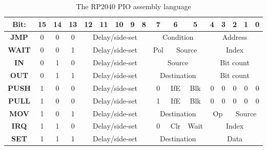 \begin{table}[h!]
    \begin{tabular}{|c|c|c|c|c|c|c|c|c|c|c|c|c|c|c|c|c|}
        \hline
        \textbf{Bit:} & 15 & 14 & 13 & 12                                  & 11                               & 10                             & 9                           & 8                          & 7 & 6 & 5 & 4 & 3 & 2 & 1 & 0 \\ \hline
        \textbf{JMP}  & 0  & 0  & 0  & \multicolumn{5}{c|}{Delay/side-set} & \multicolumn{3}{c|}{Condition}   & \multicolumn{5}{c|}{Address}                                                                                              \\ \hline
        \textbf{WAIT} & 0  & 0  & 1  & \multicolumn{5}{c|}{Delay/side-set} & Pol                              & \multicolumn{2}{c|}{Source}    & \multicolumn{5}{c|}{Index}                                                               \\ \hline
        \textbf{IN}   & 0  & 1  & 0  & \multicolumn{5}{c|}{Delay/side-set} & \multicolumn{3}{c|}{Source}      & \multicolumn{5}{c|}{Bit count}                                                                                            \\ \hline
        \textbf{OUT}  & 0  & 1  & 1  & \multicolumn{5}{c|}{Delay/side-set} & \multicolumn{3}{c|}{Destination} & \multicolumn{5}{c|}{Bit count}                                                                                            \\ \hline
        \textbf{PUSH} & 1  & 0  & 0  & \multicolumn{5}{c|}{Delay/side-set} & 0                                & IfE                            & Blk                         & 0                          & 0 & 0 & 0 & 0                 \\ \hline
        \textbf{PULL} & 1  & 0  & 0  & \multicolumn{5}{c|}{Delay/side-set} & 1                                & IfE                            & Blk                         & 0                          & 0 & 0 & 0 & 0                 \\ \hline
        \textbf{MOV}  & 1  & 0  & 1  & \multicolumn{5}{c|}{Delay/side-set} & \multicolumn{3}{c|}{Destination} & \multicolumn{2}{c|}{Op}        & \multicolumn{3}{c|}{Source}                                                              \\ \hline
        \textbf{IRQ}  & 1  & 1  & 0  & \multicolumn{5}{c|}{Delay/side-set} & 0                                & Clr                            & Wait                        & \multicolumn{5}{c|}{Index}                                 \\ \hline
        \textbf{SET}  & 1  & 1  & 1  & \multicolumn{5}{c|}{Delay/side-set} & \multicolumn{3}{c|}{Destination} & \multicolumn{5}{c|}{Data}                                                                                                 \\ \hline
    \end{tabular}
    \caption{The RP2040 PIO assembly language \cite{rp2040}}
    \label{tab:pioasm}
\end{table}

